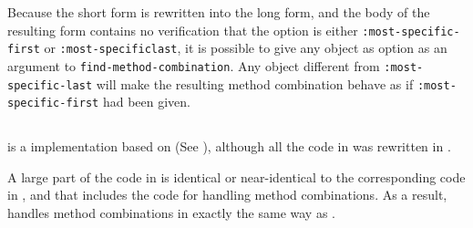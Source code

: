Because the short form is rewritten into the long form, and the body
of the resulting form contains no verification that the option is
either \texttt{:most-specific-first} or \texttt{:most-specific\-last},
it is possible to give any object as option as an argument to
\texttt{find-method-combination}.  Any object different from
\texttt{:most-specific-last} will make the resulting method
combination behave as if \texttt{:most-specific-first} had been given.

\subsection{\clasp{}}

\clasp{} is a \commonlisp{} implementation based on \ecl{} (See
), although all the \clanguage{} code in \ecl{} was
rewritten in \cplusplus{}.

A large part of the \commonlisp{} code in \clasp{} is identical or
near-identical to the corresponding code in \ecl{}, and that includes
the code for handling method combinations.  As a result, \clasp{}
handles method combinations in exactly the same way as \ecl{}.
